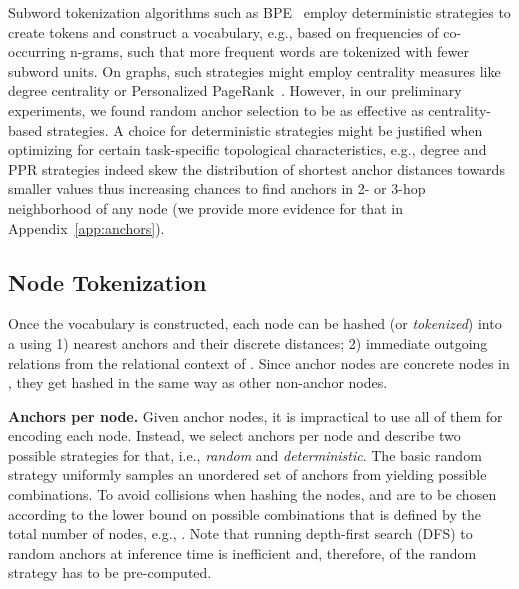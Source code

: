 \documentclass{article} \usepackage{iclr2022_conference,times}
\begin{document}
Subword tokenization algorithms such as BPE~\citep{sennrich-etal-2016-neural} employ deterministic strategies to create tokens and construct a vocabulary, e.g., based on frequencies of co-occurring n-grams, such that more frequent words are tokenized with fewer subword units. 
On graphs, such strategies might employ centrality measures like degree centrality or Personalized PageRank~\citep{ppr}. 
However, in our preliminary experiments, we found random anchor selection to be as effective as centrality-based strategies.
A choice for deterministic strategies might be justified when optimizing for certain task-specific topological characteristics, e.g., degree and PPR strategies indeed skew the distribution of shortest anchor distances towards smaller values thus increasing chances to find anchors in 2- or 3-hop neighborhood of any node (we provide more evidence for that in Appendix~\ref{app:anchors}).















\subsection{Node Tokenization}

Once the vocabulary  is constructed, each node  can be hashed (or \emph{tokenized}) into a  using 1)  nearest anchors and their discrete distances; 2)  immediate outgoing relations from the relational context of . 
Since anchor nodes are concrete nodes in , they get hashed in the same way as other non-anchor nodes.

\textbf{Anchors per node.} Given  anchor nodes, it is impractical to use all of them for encoding each node. Instead, we select  anchors per node and describe two possible strategies for that, i.e., \emph{random} and \emph{deterministic}. 
The basic random strategy uniformly samples an unordered set of  anchors from  yielding  possible combinations. 
To avoid collisions when hashing the nodes,  and  are to be chosen according to the lower bound on possible combinations that is defined by the total number of nodes, e.g., .
Note that running depth-first search (DFS) to random anchors at inference time is inefficient and, therefore,  of the random strategy has to be pre-computed.
\end{document}
